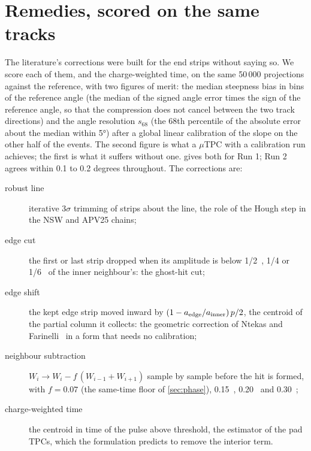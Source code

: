 \section{Remedies, scored on the same tracks}\label{sec:remedies}

The literature's corrections were built for the end strips without saying so. We score each of them, and the charge-weighted
time, on the same 50\,000 projections against the reference, with two figures of merit: the median steepness bias in bins of
the reference angle (the median of the signed angle error times the sign of the reference angle, so that the compression does
not cancel between the two track directions) and the angle resolution $s_{68}$ (the 68th percentile of the absolute error about
the median within \ang{5}) after a global linear calibration of the slope on the other half of the events. The second figure is
what a $\mu$TPC with a calibration run achieves; the first is what it suffers without one.  gives both for
Run 1; Run 2 agrees within 0.1 to 0.2 degrees throughout. The corrections are:

\begin{description}
\item[robust line] iterative $3\sigma$ trimming of strips about the line, the role of the Hough step in the NSW and APV25 chains;
\item[edge cut] the first or last strip dropped when its amplitude is below 1/2~\cite{Rinnagel2019}, 1/4 or 1/6~\cite{Sessa2014} of the
  inner neighbour's: the ghost-hit cut;
\item[edge shift] the kept edge strip moved inward by $(1 - a_{\rm edge}/a_{\rm inner})\,p/2$, the centroid of the partial column
  it collects: the geometric correction of Ntekas and Farinelli~\cite{Ntekas2016,Farinelli2019} in a form that needs no calibration;
\item[neighbour subtraction] $W_i \to W_i - f\,(W_{i-1} + W_{i+1})$ sample by sample before the hit is formed, with $f = 0.07$ (the
  same-time floor of \cref{sec:phase}), 0.15~\cite{Loesel2017,Flierl2018}, 0.20~\cite{Flierl2018} and 0.30~\cite{Herrmann2019};
\item[charge-weighted time] the centroid in time of the pulse above threshold, the estimator of the pad TPCs, which the formulation
  predicts to remove the interior term.
\end{description}

